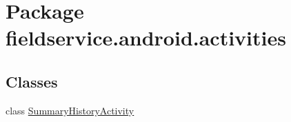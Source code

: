 \hypertarget{namespacefieldservice_1_1android_1_1activities}{\section{Package fieldservice.\+android.\+activities}
\label{namespacefieldservice_1_1android_1_1activities}
}
\subsection*{Classes}
\begin{DoxyCompactItemize}
\item 
class \hyperlink{classfieldservice_1_1android_1_1activities_1_1_summary_history_activity}{Summary\+History\+Activity}
\end{DoxyCompactItemize}
